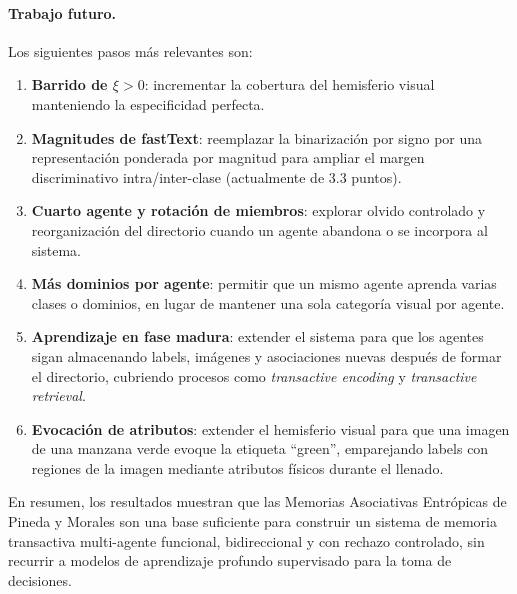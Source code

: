 \paragraph{Trabajo futuro.}
Los siguientes pasos más relevantes son:
\begin{enumerate}
    \item \textbf{Barrido de $\xi > 0$}: incrementar la cobertura del hemisferio visual manteniendo la especificidad perfecta.
    \item \textbf{Magnitudes de fastText}: reemplazar la binarización por signo por una representación ponderada por magnitud para ampliar el margen discriminativo intra/inter-clase (actualmente de 3.3 puntos).
    \item \textbf{Cuarto agente y rotación de miembros}: explorar olvido controlado y reorganización del directorio cuando un agente abandona o se incorpora al sistema.
    \item \textbf{Más dominios por agente}: permitir que un mismo agente aprenda varias clases o dominios, en lugar de mantener una sola categoría visual por agente.
    \item \textbf{Aprendizaje en fase madura}: extender el sistema para que los agentes sigan almacenando labels, imágenes y asociaciones nuevas después de formar el directorio, cubriendo procesos como \emph{transactive encoding} y \emph{transactive retrieval}.
    \item \textbf{Evocación de atributos}: extender el hemisferio visual para que una imagen de una manzana verde evoque la etiqueta ``green'', emparejando labels con regiones de la imagen mediante atributos físicos durante el llenado.
\end{enumerate}

\bigskip

En resumen, los resultados muestran que las Memorias Asociativas Entrópicas de Pineda y Morales son una base suficiente para construir un sistema de memoria transactiva multi-agente funcional, bidireccional y con rechazo controlado, sin recurrir a modelos de aprendizaje profundo supervisado para la toma de decisiones.
